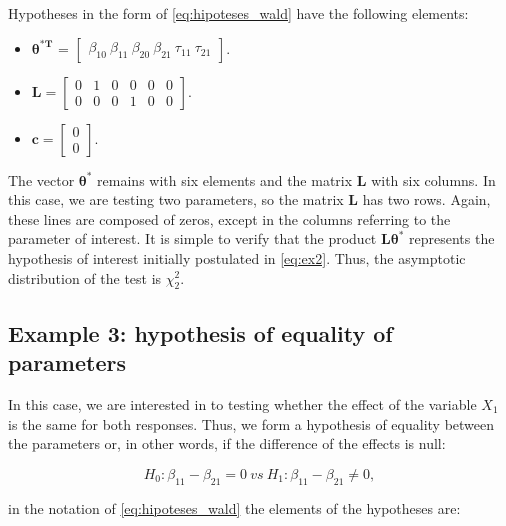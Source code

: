 \documentclass[AMA,STIX1COL]{WileyNJD-v2}
\begin{document}
Hypotheses in the form of \autoref{eq:hipoteses_wald} have the following elements:

\begin{itemize}
  
  \item $\boldsymbol{\theta^{*T}}$ = $\begin{bmatrix} \beta_{10} \  \beta_{11} \ \beta_{20} \ \beta_{21} \ \tau_{11} \ \tau_{21} \end{bmatrix}$.


\item $\boldsymbol{L} = \begin{bmatrix} 0 & 1 & 0 & 0 & 0 & 0 \\
0 & 0 & 0 & 1 & 0 & 0 \end{bmatrix}.$
 
\item $\boldsymbol{c} = \begin{bmatrix} 0 \\ 0 \end{bmatrix}.$ 

\end{itemize}

The vector $\boldsymbol{\theta^{*}}$ remains with six elements and the matrix $\boldsymbol{L}$ with six columns. In this case, we are testing two parameters, so the matrix $\boldsymbol{L}$ has two rows. Again, these lines are composed of zeros, except in the columns referring to the parameter of interest. It is simple to verify that the product $\boldsymbol{L}\boldsymbol{\theta^{*}}$ represents the hypothesis of interest initially postulated in \autoref{eq:ex2}. Thus, the asymptotic distribution of the test is $\chi^2_2$.

\subsection{Example 3: hypothesis of equality of parameters}

In this case, we are interested in to testing whether the effect of the variable $X_1$ is the same for both responses. Thus, we form a hypothesis of equality between the parameters or, in other words, if the difference of the effects is null:

\begin{equation}
\label{eq:ex3}
H_0: \beta_{11} - \beta_{21} = 0 \ vs \ H_1: \beta_{11} - \beta_{21} \neq 0,
\end{equation}

\noindent in the notation of \autoref{eq:hipoteses_wald} the elements of the hypotheses are:
\end{document}
